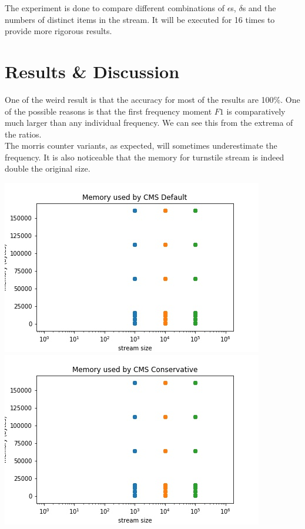 \documentclass[a4paper, 11pt]{article}
\begin{document}
        The experiment is done to compare different combinations of $\epsilon$s, $\delta$s and the numbers of distinct items in the stream. It will be executed for 16 times to provide more rigorous results.
    \section{Results \& Discussion}
        One of the weird result is that the accuracy for most of the results are 100\%. One of the possible reasons is that the first frequency moment $F1$ is comparatively much larger than any individual frequency. We can see this from the extrema of the ratios. \\

        \noindent The morris counter variants, as expected, will sometimes underestimate the frequency. It is also noticeable that the memory for turnstile stream is indeed double the original size.

        \begin{center}
            \includegraphics[scale=0.5]{memory_default}
            \includegraphics[scale=0.5]{memory_conservative}
        \end{center}
\end{document}
